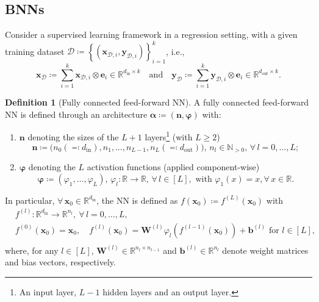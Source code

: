 \documentclass[a4paper, 11pt, reqno]{amsart}
\theoremstyle{plain}
\theoremstyle{remark}
\theoremstyle{definition}
\newtheorem{definition}[theorem]{Definition}
\newcommand{\real}{\mathbb{R}}
\renewcommand{\natural}{\mathbb{N}}
\let\oldforall\forall
\renewcommand{\forall}{\oldforall\,}
\newcommand{\train}{\mathcal{D}}
\begin{document}
\subsection{BNNs}

Consider a supervised learning framework in a regression setting, with a given training dataset $\train \coloneqq \left\{\left(\bm{x}_{\mathcal{D}, i}, \bm{y}_{\mathcal{D}, i}\right)\right\}_{i = 1}^k$, i.e.,
\begin{equation*}
    \bm{x}_{\mathcal{D}} \coloneqq \sum_{i = 1}^k \bm{x}_{\mathcal{D}, i} \otimes \bm{e}_i \in \real^{d_{\mathrm{in}} \times k} \quad \text{and} \quad
    \bm{y}_{\mathcal{D}} \coloneqq \sum_{i = 1}^k \bm{y}_{\mathcal{D}, i} \otimes \bm{e}_i \in \real^{d_{\mathrm{out}} \times k}.
\end{equation*}

\begin{definition}[Fully connected feed-forward NN] \label{def:nn}
    A fully connected feed-forward NN is defined through an architecture $\bm{\alpha} \coloneqq (\bm{n}, \bm{\varphi})$ with:
    \begin{enumerate}
        \item $\bm{n}$ denoting the sizes of the $L + 1$ layers\footnote{An input layer, $L - 1$ hidden layers and an output layer.} (with $L \geq 2$)
        \begin{equation*}
            \bm{n} \coloneqq \big(n_0 (\eqcolon d_{\mathrm{in}}), n_1, \dots, n_{L - 1}, n_L (\eqcolon d_{\mathrm{out}})\big), \, n_l \in \natural_{> 0}, \, \forall l = 0, \dots, L;
        \end{equation*}		
        \item $\bm{\varphi}$ denoting the $L$ activation functions (applied component-wise)
        \begin{equation*}
            \bm{\varphi} \coloneqq (\varphi_1, \dots, \varphi_L), \, \varphi_l: \real \to \real, \, \forall l \in [L], \text{ with } \varphi_1(x) = x, \forall x \in \real.
        \end{equation*}
    \end{enumerate}
    In particular, $\forall \bm{x}_0 \in \real^{d_{\mathrm{in}}}$, the NN is defined as $f(\bm{x}_0) \coloneqq f^{(L)}(\bm{x}_0)$ with
    \begin{equation} \label{eq:nn}
        \begin{aligned}
            & f^{(l)}: \real^{d_{\mathrm{in}}} \to \real^{n_l}, \ \forall l = 0, \dots, L, \\
            & f^{(0)}(\bm{x}_0) = \bm{x}_0, \quad f^{(l)}(\bm{x}_0) = \bm{W}^{(l)} \varphi_l\left(f^{(l - 1)}(\bm{x}_0)\right) + \bm{b}^{(l)} \text{ for } l \in [L], \\
        \end{aligned}
    \end{equation}
    where, for any $l \in [L]$, $\bm{W}^{(l)} \in \real^{n_l \times n_{l - 1}}$ and $\bm{b}^{(l)} \in \real^{n_l}$ denote weight matrices and bias vectors, respectively.
\end{definition}
\end{document}
